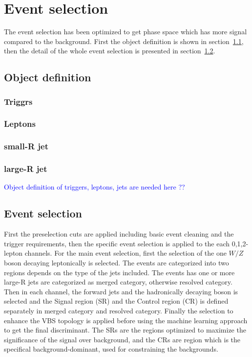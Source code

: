 \chapter{Event selection}
\label{chap:eventselection}
The event selection has been optimized to get phase space which has more signal compared to the background.
First the object definition is shown in section~\ref{sec:object}, then the detail of the whole event selection is presented in section~\ref{sec:eventselection}.
\section{Object definition}
\label{sec:object}
\subsection{Triggrs}
\subsection{Leptons}
\subsection{small-R jet}
\subsection{large-R jet}
\textcolor{blue}{Object definition of triggers, leptons, jets are needed here ??}
\section{Event selection}
\label{sec:eventselection}
First the preselection cuts are applied including basic event cleaning and the trigger requirements, then the specific event selection is applied to the each 0,1,2-lepton channels.
For the main event selection, first the selection of the one $W/Z$ boson decaying leptonically is selected. 
The events are categorized into two regions depends on the type of the jets included. The events has one or more large-R jets are categorized as merged category, otherwise resolved category.  
Then in each channel, the forward jets and the hadronically decaying boson is selected and the Signal region (SR) and the Control region (CR) is defined separately in merged category and resolved category. Finally the selection to enhance the VBS topology is applied before using the machine learning approach to get the final discriminant. The SRs are the regions optimized to maximize the significance of the signal over background, and the CRs are region which is the specifical background-dominant, used for constraining the backgrounds. 


